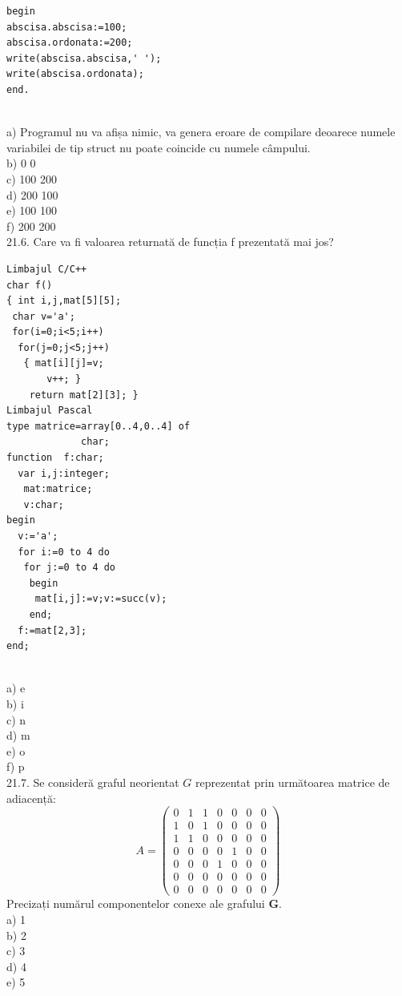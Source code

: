 {{\begin{verbatim}
begin 
abscisa.abscisa:=100; 
abscisa.ordonata:=200; 
write(abscisa.abscisa,' '); 
write(abscisa.ordonata); 
end. 
\end{verbatim}
\\
a) Programul nu va afișa 
nimic, va genera eroare 
de compilare deoarece 
numele variabilei de tip 
struct nu poate coincide 
cu numele câmpului.
\\
b) 0 0
\\
c) 100 200
\\
d) 200 100
\\
e) 100 100
\\
f) 200 200
\\
21.6. Care va fi valoarea returnată de funcția f prezentată mai jos?
\begin{verbatim}
Limbajul C/C++ 
char f() 
{ int i,j,mat[5][5]; 
 char v='a'; 
 for(i=0;i<5;i++) 
  for(j=0;j<5;j++) 
   { mat[i][j]=v; 
       v++; } 
    return mat[2][3]; }
Limbajul Pascal 
type matrice=array[0..4,0..4] of 
             char;    
function  f:char; 
  var i,j:integer; 
   mat:matrice; 
   v:char; 
begin 
  v:='a'; 
  for i:=0 to 4 do 
   for j:=0 to 4 do 
    begin 
     mat[i,j]:=v;v:=succ(v); 
    end; 
  f:=mat[2,3]; 
end; 
\end{verbatim}
\\
a) e
\\
b) i
\\
c) n
\\
d) m
\\
e) o
\\
f) p
\\
21.7. Se consideră graful neorientat $G$ reprezentat prin următoarea matrice de adiacență:
$$
A=\left(\begin{array}{lllllll}
0 & 1 & 1 & 0 & 0 & 0 & 0 \\
1 & 0 & 1 & 0 & 0 & 0 & 0 \\
1 & 1 & 0 & 0 & 0 & 0 & 0 \\
0 & 0 & 0 & 0 & 1 & 0 & 0 \\
0 & 0 & 0 & 1 & 0 & 0 & 0 \\
0 & 0 & 0 & 0 & 0 & 0 & 0 \\
0 & 0 & 0 & 0 & 0 & 0 & 0
\end{array}\right)
$$
Precizați numărul componentelor conexe ale grafului $\mathbf{G}$.
\\
a) 1
\\
b) 2
\\
c) 3
\\
d) 4
\\
e) 5
\\
}}
